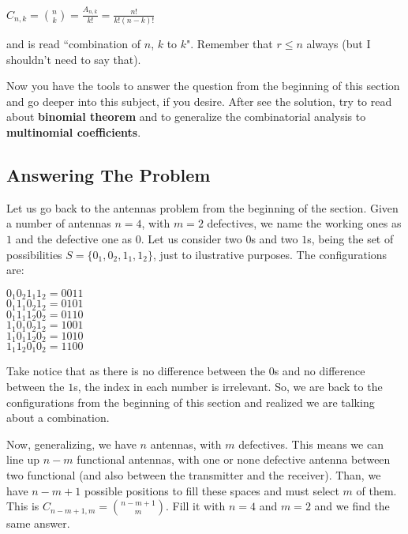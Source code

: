 \documentclass[a4paper,twocolumn]{article}
\begin{document}
\begin{center}
$C_{n,k} = \binom{n}{k} = \frac{A_{n,k}}{k!} = \frac{n!}{k!(n - k)!}$
\end{center}

\noindent and is read ``combination of $n$, $k$ to $k$". Remember that $r \leq n$ always (but I shouldn't need to say that).

Now you have the tools to answer the question from the beginning of this section and go deeper into this subject, if you desire. After see the solution, try to read about \textbf{binomial theorem} and to generalize the combinatorial analysis to \textbf{multinomial coefficients}.


\subsection{Answering The Problem}
\label{subsec:answer-comb-anal}

Let us go back to the antennas problem from the beginning of the section. Given a number of antennas $n = 4$, with $m = 2$ defectives, we name the working ones as $1$ and the defective one as $0$. Let us consider two $0$s and two $1$s, being the set of possibilities $S = \{0_1, 0_2, 1_1, 1_2\}$, just to ilustrative purposes. The configurations are:

\begin{center}
$0_1 0_2 1_1 1_2 = 0 0 1 1$\\
$0_1 1_1 0_2 1_2 = 0 1 0 1$\\
$0_1 1_1 1_2 0_2 = 0 1 1 0$\\
$1_1 0_1 0_2 1_2 = 1 0 0 1$\\
$1_1 0_1 1_2 0_2 = 1 0 1 0$\\
$1_1 1_2 0_1 0_2 = 1 1 0 0$\\
\end{center}

\noindent Take notice that as there is no difference between the $0$s and no difference between the $1$s, the index in each number is irrelevant. So, we are back to the configurations from the beginning of this section and realized we are talking about a combination.

Now, generalizing, we have $n$ antennas, with $m$ defectives. This means we can line up $n - m$ functional antennas, with one or none defective antenna between two functional (and also between the transmitter and the receiver). Than, we have $n - m + 1$ possible positions to fill these spaces and must select $m$ of them. This is $C_{n - m + 1,m} = \binom{n - m + 1}{m}$. Fill it with $n = 4$ and $m = 2$ and we find the same answer.
\end{document}
